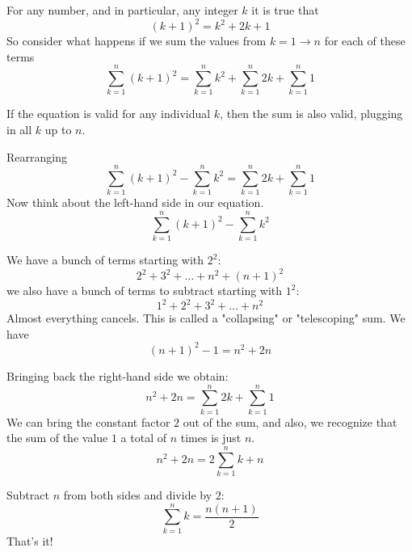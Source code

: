 \documentclass[11pt, oneside]{article}
\begin{document}
For any number, and in particular, any integer $k$ it is true that
\[ (k+1)^2 = k^2 + 2k + 1 \]
So consider what happens if we sum the values from $k=1 \rightarrow n$ for each of these terms
\[ \sum_{k=1}^n (k+1)^2 = \sum_{k=1}^n k^2 + \sum_{k=1}^n 2k + \sum_{k=1}^n 1 \]

If the equation is valid for any individual $k$, then the sum is also valid, plugging in all $k$ up to $n$.

Rearranging
\[ \sum_{k=1}^n (k+1)^2 - \sum_{k=1}^n k^2 = \sum_{k=1}^n 2k + \sum_{k=1}^n 1 \]
Now think about the left-hand side in our equation. 
\[ \sum_{k=1}^n (k+1)^2 - \sum_{k=1}^n k^2 \]

We have a bunch of terms starting with $2^2$:
\[ 2^2 + 3^2 + \dots + n^2 + (n+1)^2 \]
we also have a bunch of terms to subtract starting with $1^2$:
\[ 1^2 + 2^2 + 3^2 + \dots + n^2 \]
Almost everything cancels.  This is called a "collapsing" or "telescoping" sum.  We have
\[ (n+1)^2 - 1 = n^2 + 2n \]

Bringing back the right-hand side  we obtain:
\[ n^2 + 2n = \sum_{k=1}^n 2k + \sum_{k=1}^n 1 \]
We can bring the constant factor $2$ out of the sum, and also, we recognize that the sum of the value $1$ a total of $n$ times is just $n$.
\[ n^2 + 2n = 2\sum_{k=1}^n k + n \]

Subtract $n$ from both sides and divide by $2$:
\[ \sum_{k=1}^n k = \frac{n (n+1)}{2} \]
That's it!
\end{document}
